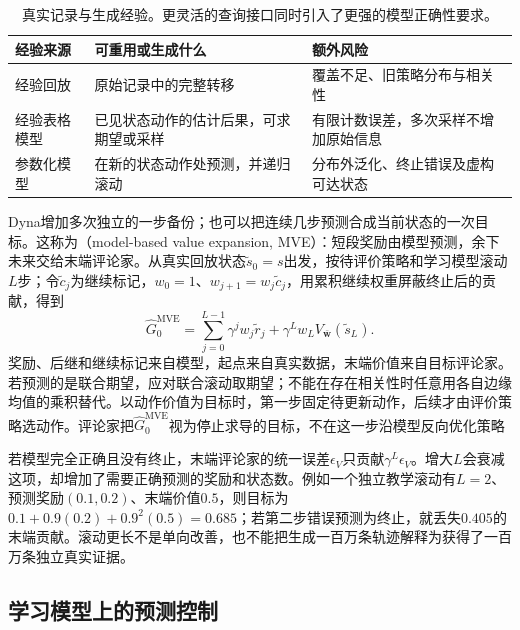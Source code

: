\begin{table}[htbp]
  \centering
  \small
  \begin{tabularx}{\linewidth}{>{\raggedright\arraybackslash}p{21mm} >{\raggedright\arraybackslash}X >{\raggedright\arraybackslash}X}
    \toprule
    经验来源 & 可重用或生成什么 & 额外风险 \\
    \midrule
    经验回放 & 原始记录中的完整转移 & 覆盖不足、旧策略分布与相关性 \\
    经验表格模型 & 已见状态动作的估计后果，可求期望或采样 & 有限计数误差，多次采样不增加原始信息 \\
    参数化模型 & 在新的状态动作处预测，并递归滚动 & 分布外泛化、终止错误及虚构可达状态 \\
    \bottomrule
  \end{tabularx}
  \caption{真实记录与生成经验。更灵活的查询接口同时引入了更强的模型正确性要求。}
  \label{tab:rl-learning-generated-experience}
\end{table}

Dyna增加多次独立的一步备份；也可以把连续几步预测合成当前状态的一次目标。这称为（model-based value expansion, MVE）：短段奖励由模型预测，余下未来交给末端评论家。从真实回放状态$\widetilde s_0=s$出发，按待评价策略和学习模型滚动$L$步；令$\widetilde c_j$为继续标记，$w_0=1$、$w_{j+1}=w_j\widetilde c_j$，用累积继续权重屏蔽终止后的贡献，得到
\begin{equation}
  \widehat G^{\mathrm{MVE}}_0
  =\sum_{j=0}^{L-1}\gamma^j w_j\widetilde r_j
    +\gamma^L w_L V_{\bar{\bm w}}(\widetilde s_L).
  \label{eq:rl-learning-mve}
\end{equation}
奖励、后继和继续标记来自模型，起点来自真实数据，末端价值来自目标评论家。若预测的是联合期望，应对联合滚动取期望；不能在存在相关性时任意用各自边缘均值的乘积替代。以动作价值为目标时，第一步固定待更新动作，后续才由评价策略选动作。评论家把$\widehat G^{\mathrm{MVE}}_0$视为停止求导的目标，不在这一步沿模型反向优化策略

若模型完全正确且没有终止，末端评论家的统一误差$\epsilon_V$只贡献$\gamma^L\epsilon_V$。增大$L$会衰减这项，却增加了需要正确预测的奖励和状态数。例如一个独立教学滚动有$L=2$、预测奖励$(0.1,0.2)$、末端价值$0.5$，则目标为$0.1+0.9(0.2)+0.9^2(0.5)=0.685$；若第二步错误预测为终止，就丢失$0.405$的末端贡献。滚动更长不是单向改善，也不能把生成一百万条轨迹解释为获得了一百万条独立真实证据。

\subsection{学习模型上的预测控制}
\label{sec:rl-learning-learned-mpc}

